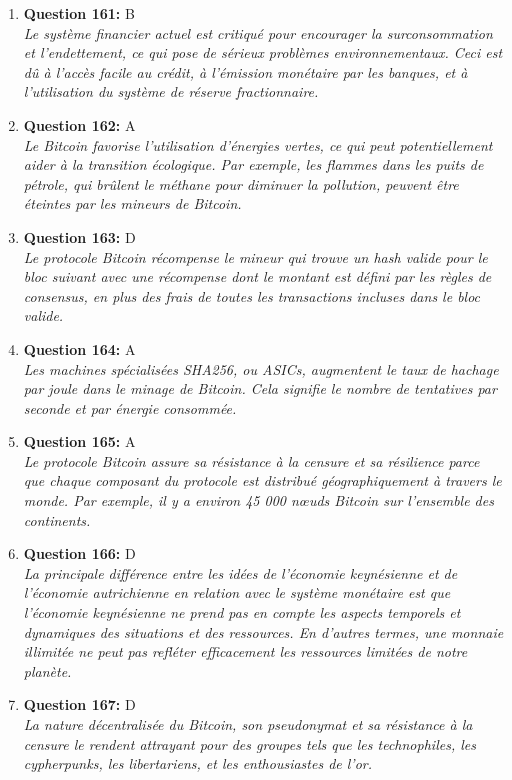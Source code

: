 \documentclass[12pt,a4paper]{article}
\begin{document}
\begin{enumerate}
\item \textbf{Question 161:} B
\\ \textit{Le système financier actuel est critiqué pour encourager la surconsommation et l'endettement, ce qui pose de sérieux problèmes environnementaux. Ceci est dû à l'accès facile au crédit, à l'émission monétaire par les banques, et à l'utilisation du système de réserve fractionnaire.}

\item \textbf{Question 162:} A
\\ \textit{Le Bitcoin favorise l'utilisation d'énergies vertes, ce qui peut potentiellement aider à la transition écologique. Par exemple, les flammes dans les puits de pétrole, qui brûlent le méthane pour diminuer la pollution, peuvent être éteintes par les mineurs de Bitcoin.}

\item \textbf{Question 163:} D
\\ \textit{Le protocole Bitcoin récompense le mineur qui trouve un hash valide pour le bloc suivant avec une récompense dont le montant est défini par les règles de consensus, en plus des frais de toutes les transactions incluses dans le bloc valide.}

\item \textbf{Question 164:} A
\\ \textit{Les machines spécialisées SHA256, ou ASICs, augmentent le taux de hachage par joule dans le minage de Bitcoin. Cela signifie le nombre de tentatives par seconde et par énergie consommée.}

\item \textbf{Question 165:} A
\\ \textit{Le protocole Bitcoin assure sa résistance à la censure et sa résilience parce que chaque composant du protocole est distribué géographiquement à travers le monde. Par exemple, il y a environ 45 000 nœuds Bitcoin sur l'ensemble des continents.}

\item \textbf{Question 166:} D
\\ \textit{La principale différence entre les idées de l'économie keynésienne et de l'économie autrichienne en relation avec le système monétaire est que l'économie keynésienne ne prend pas en compte les aspects temporels et dynamiques des situations et des ressources. En d'autres termes, une monnaie illimitée ne peut pas refléter efficacement les ressources limitées de notre planète.}

\item \textbf{Question 167:} D
\\ \textit{La nature décentralisée du Bitcoin, son pseudonymat et sa résistance à la censure le rendent attrayant pour des groupes tels que les technophiles, les cypherpunks, les libertariens, et les enthousiastes de l'or.}


\end{enumerate}
\end{document}
